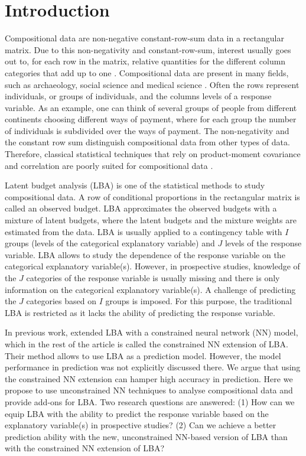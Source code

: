 \documentclass[]{interact}
\theoremstyle{plain}%
\theoremstyle{definition}
\theoremstyle{remark}
\begin{document}
\hypertarget{introduction}{%
\section{Introduction}\label{introduction}}

Compositional data are non-negative constant-row-sum data in a
rectangular matrix. Due to this non-negativity and constant-row-sum,
interest usually goes out to, for each row in the matrix, relative
quantities for the different column categories that add up to one
\citep{PG2006}. Compositional data are present in many fields, such as
archaeology, social science and medical science
\citep{Aitchison1994, Aitchison2008, baxter2006, PG2017, raun2016}.
Often the rows represent individuals, or groups of individuals, and the
columns levels of a response variable. As an example, one can think of
several groups of people from different continents choosing different
ways of payment, where for each group the number of individuals is
subdivided over the ways of payment. The non-negativity and the constant
row sum distinguish compositional data from other types of data.
Therefore, classical statistical techniques that rely on product-moment
covariance and correlation are poorly suited for compositional data
\citep{Aitchison1994, Aitchison2008}.

Latent budget analysis (LBA) \citep{Heijden1992} is one of the
statistical methods to study compositional data. A row of conditional
proportions in the rectangular matrix is called an observed budget. LBA
approximates the observed budgets with a mixture of latent budgets,
where the latent budgets and the mixture weights are estimated from the
data. LBA is usually applied to a contingency table with \(I\) groups
(levels of the categorical explanatory variable) and \(J\) levels of the
response variable. LBA allows to study the dependence of the response
variable on the categorical explanatory variable(s). However, in
prospective studies, knowledge of the \(J\) categories of the response
variable is usually missing and there is only information on the
categorical explanatory variable(s). A challenge of predicting the \(J\)
categories based on \(I\) groups is imposed. For this purpose, the
traditional LBA is restricted as it lacks the ability of predicting the
response variable.

In previous work, \cite{SM2001} extended LBA with a constrained neural
network (NN) model, which in the rest of the article is called the
constrained NN extension of LBA. Their method allows to use LBA as a
prediction model. However, the model performance in prediction was not
explicitly discussed there. We argue that using the constrained NN
extension can hamper high accuracy in prediction. Here we propose to use
unconstrained NN techniques to analyse compositional data and provide
add-ons for LBA. Two research questions are answered: (1) How can we
equip LBA with the ability to predict the response variable based on the
explanatory variable(s) in prospective studies? (2) Can we achieve a
better prediction ability with the new, unconstrained NN-based version
of LBA than with the constrained NN extension of LBA?
\end{document}
